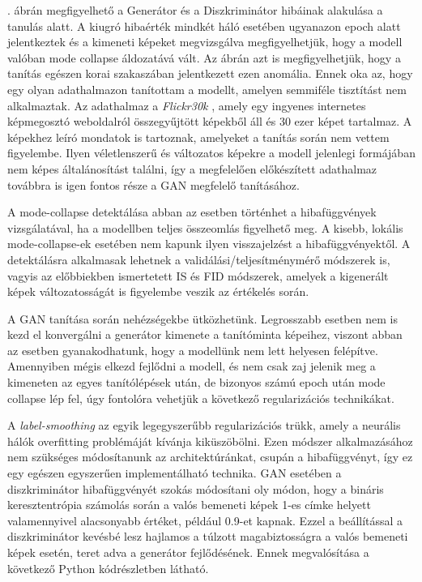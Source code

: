 . ábrán megfigyelhető a Generátor és a Diszkriminátor hibáinak alakulása a tanulás alatt. A kiugró hibaérték mindkét háló esetében ugyanazon epoch alatt jelentkeztek és a kimeneti képeket megvizsgálva megfigyelhetjük, hogy a modell valóban mode collapse áldozatává vált. Az ábrán azt is megfigyelhetjük, hogy a tanítás egészen korai szakaszában jelentkezett ezen anomália. Ennek oka az, hogy egy olyan adathalmazon tanítottam a modellt, amelyen semmiféle tisztítást nem alkalmaztak. Az adathalmaz a \textit{Flickr30k} \cite{young2014image}, amely egy ingyenes internetes képmegosztó weboldalról összegyűjtött képekből áll és 30 ezer képet tartalmaz. A képekhez leíró mondatok is tartoznak, amelyeket a tanítás során nem vettem figyelembe. Ilyen véletlenszerű és változatos képekre a modell jelenlegi formájában nem képes általánosítást találni, így a megfelelően előkészített adathalmaz továbbra is igen fontos része a GAN megfelelő tanításához.

A mode-collapse detektálása abban az esetben történhet a hibafüggvények vizsgálatával, ha a modellben teljes összeomlás figyelhető meg. A kisebb, lokális mode-collapse-ek esetében nem kapunk ilyen visszajelzést a hibafüggvényektől. A detektálásra alkalmasak lehetnek a validálási/teljesítménymérő módszerek is, vagyis az előbbiekben ismertetett IS és FID módszerek, amelyek a kigenerált képek változatosságát is figyelembe veszik az értékelés során.


A GAN tanítása során nehézségekbe ütközhetünk. Legrosszabb esetben nem is kezd el konvergálni a generátor kimenete a tanítóminta képeihez, viszont abban az esetben gyanakodhatunk, hogy a modellünk nem lett helyesen felépítve. Amennyiben mégis elkezd fejlődni a modell, és nem csak zaj jelenik meg a kimeneten az egyes tanítólépések után, de bizonyos számú epoch után mode collapse lép fel, úgy fontolóra vehetjük a következő regularizációs technikákat.


A \textit{label-smoothing} az egyik legegyszerűbb regularizációs trükk, amely a neurális hálók overfitting problémáját kívánja kiküszöbölni. Ezen módszer alkalmazásához nem szükséges módosítanunk az architektúránkat, csupán a hibafüggvényt, így ez egy egészen egyszerűen implementálható technika. GAN esetében a diszkriminátor hibafüggvényét szokás módosítani oly módon, hogy a bináris keresztentrópia számolás során a valós bemeneti képek 1-es címke helyett valamennyivel alacsonyabb értéket, például 0.9-et kapnak. Ezzel a beállítással a diszkriminátor kevésbé lesz hajlamos a túlzott magabiztosságra a valós bemeneti képek esetén, teret adva a generátor fejlődésének. Ennek megvalósítása a következő Python kódrészletben látható.

